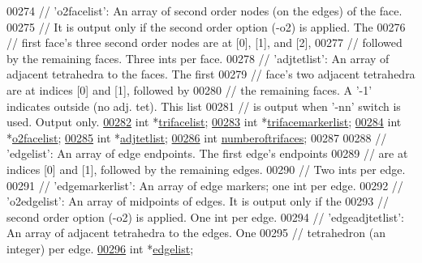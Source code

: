 \begin{DoxyCode}
00274   \textcolor{comment}{// 'o2facelist':  An array of second order nodes (on the edges) of the face.}
00275   \textcolor{comment}{//   It is output only if the second order option (-o2) is applied. The}
00276   \textcolor{comment}{//   first face's three second order nodes are at [0], [1], and [2],}
00277   \textcolor{comment}{//   followed by the remaining faces.  Three ints per face.}
00278   \textcolor{comment}{// 'adjtetlist':  An array of adjacent tetrahedra to the faces. The first}
00279   \textcolor{comment}{//   face's two adjacent tetrahedra are at indices [0] and [1], followed by}
00280   \textcolor{comment}{//   the remaining faces.  A '-1' indicates outside (no adj. tet). This list}
00281   \textcolor{comment}{//   is output when '-nn' switch is used. Output only.}
\hypertarget{tetgen_8h_source.tex_l00282}{}\hyperlink{classtetgenio_a25e290684bfb26d4d9b5e67059c572e2}{00282}   \textcolor{keywordtype}{int} *\hyperlink{classtetgenio_a25e290684bfb26d4d9b5e67059c572e2}{trifacelist};
\hypertarget{tetgen_8h_source.tex_l00283}{}\hyperlink{classtetgenio_a22a2e0937d0da63a2fda26fc1671b32f}{00283}   \textcolor{keywordtype}{int} *\hyperlink{classtetgenio_a22a2e0937d0da63a2fda26fc1671b32f}{trifacemarkerlist};
\hypertarget{tetgen_8h_source.tex_l00284}{}\hyperlink{classtetgenio_aad1e2f66ad5c438fb2bee5d510fdca19}{00284}   \textcolor{keywordtype}{int} *\hyperlink{classtetgenio_aad1e2f66ad5c438fb2bee5d510fdca19}{o2facelist};
\hypertarget{tetgen_8h_source.tex_l00285}{}\hyperlink{classtetgenio_a44f7eb61256dfb95d2fa2bdb91ea3718}{00285}   \textcolor{keywordtype}{int} *\hyperlink{classtetgenio_a44f7eb61256dfb95d2fa2bdb91ea3718}{adjtetlist};
\hypertarget{tetgen_8h_source.tex_l00286}{}\hyperlink{classtetgenio_aba0186083c61eb48fca7e80b4a3158f2}{00286}   \textcolor{keywordtype}{int} \hyperlink{classtetgenio_aba0186083c61eb48fca7e80b4a3158f2}{numberoftrifaces};
00287 
00288   \textcolor{comment}{// 'edgelist':  An array of edge endpoints.  The first edge's endpoints}
00289   \textcolor{comment}{//   are at indices [0] and [1], followed by the remaining edges.}
00290   \textcolor{comment}{//   Two ints per edge.}
00291   \textcolor{comment}{// 'edgemarkerlist':  An array of edge markers; one int per edge.}
00292   \textcolor{comment}{// 'o2edgelist':  An array of midpoints of edges. It is output only if the}
00293   \textcolor{comment}{//   second order option (-o2) is applied. One int per edge.}
00294   \textcolor{comment}{// 'edgeadjtetlist':  An array of adjacent tetrahedra to the edges.  One}
00295   \textcolor{comment}{//   tetrahedron (an integer) per edge.}
\hypertarget{tetgen_8h_source.tex_l00296}{}\hyperlink{classtetgenio_ad4910159c1aa4dad3e66b24d8816f76c}{00296}   \textcolor{keywordtype}{int} *\hyperlink{classtetgenio_ad4910159c1aa4dad3e66b24d8816f76c}{edgelist};

\end{DoxyCode}
